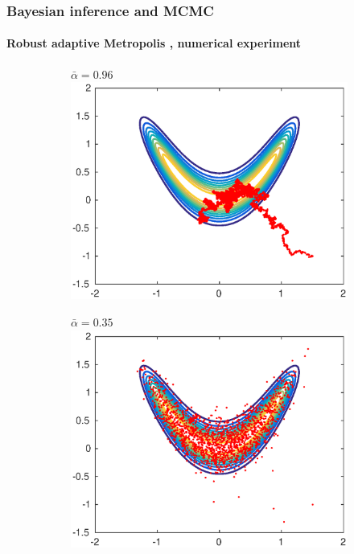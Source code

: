 \documentclass{beamer}
\begin{document}
\begin{frame}
	\frametitle{Bayesian inference and MCMC}
	\framesubtitle{Robust adaptive Metropolis \cite{Vih12}, numerical experiment}
	\begin{figure}[t]
		\centering
		\begin{subfigure}{0.32\linewidth}
			\centering
			\tiny{$\bar \alpha = 0.96$}
			\includegraphics[width=1\linewidth]{../plots/MHvsRAM/MH_small}
		\end{subfigure}
		\begin{subfigure}{0.32\linewidth}
			\centering
			\tiny{$\bar \alpha = 0.35$}
			\includegraphics[width=1\linewidth]{../plots/MHvsRAM/MH_medium}

\end{subfigure}
\end{figure}
\end{frame}
\end{document}
